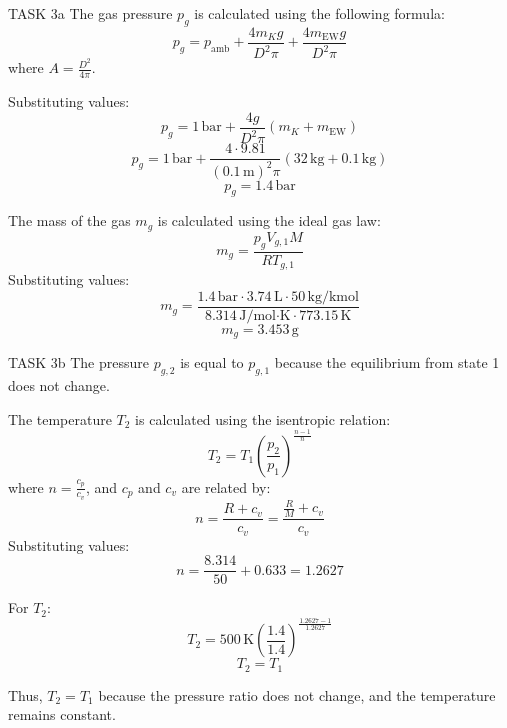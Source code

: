 TASK 3a  
The gas pressure \( p_g \) is calculated using the following formula:  
\[
p_g = p_{\text{amb}} + \frac{4 m_K g}{D^2 \pi} + \frac{4 m_{\text{EW}} g}{D^2 \pi}
\]
where \( A = \frac{D^2}{4 \pi} \).  

Substituting values:  
\[
p_g = 1 \, \text{bar} + \frac{4 g}{D^2 \pi} (m_K + m_{\text{EW}})
\]
\[
p_g = 1 \, \text{bar} + \frac{4 \cdot 9.81}{(0.1 \, \text{m})^2 \pi} (32 \, \text{kg} + 0.1 \, \text{kg})
\]
\[
p_g = 1.4 \, \text{bar}
\]

The mass of the gas \( m_g \) is calculated using the ideal gas law:  
\[
m_g = \frac{p_g V_{g,1} M}{R T_{g,1}}
\]
Substituting values:  
\[
m_g = \frac{1.4 \, \text{bar} \cdot 3.74 \, \text{L} \cdot 50 \, \text{kg/kmol}}{8.314 \, \text{J/mol·K} \cdot 773.15 \, \text{K}}
\]
\[
m_g = 3.453 \, \text{g}
\]

TASK 3b  
The pressure \( p_{g,2} \) is equal to \( p_{g,1} \) because the equilibrium from state 1 does not change.  

The temperature \( T_2 \) is calculated using the isentropic relation:  
\[
T_2 = T_1 \left( \frac{p_2}{p_1} \right)^{\frac{n-1}{n}}
\]
where \( n = \frac{c_p}{c_v} \), and \( c_p \) and \( c_v \) are related by:  
\[
n = \frac{R + c_v}{c_v} = \frac{\frac{R}{M} + c_v}{c_v}
\]
Substituting values:  
\[
n = \frac{8.314}{50} + 0.633 = 1.2627
\]

For \( T_2 \):  
\[
T_2 = 500 \, \text{K} \left( \frac{1.4}{1.4} \right)^{\frac{1.2627 - 1}{1.2627}}
\]
\[
T_2 = T_1
\]

Thus, \( T_2 = T_1 \) because the pressure ratio does not change, and the temperature remains constant.